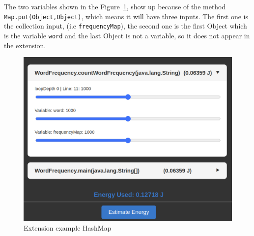 The two variables shown in the Figure~\ref{fig:extension_example1}, show up because of the method \texttt{Map.put(Object,Object)}, which means it will have three inputs. The first one is the collection input, (i.e \texttt{frequencyMap}), the second one is the first Object which is the variable \texttt{word} and the last Object is not a variable, so it does not appear in the extension. 


\begin{figure}[htbp]
  \centering
  \includegraphics[width = .8 \textwidth]{figures/extension_example1.png}
  \caption{Extension example HashMap}
  \label{fig:extension_example1}
\end{figure}






